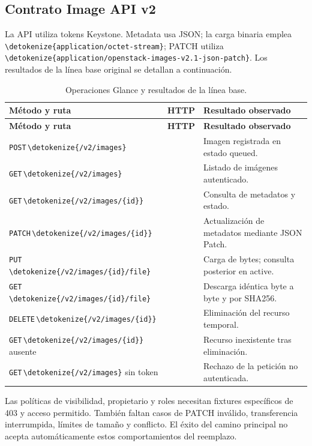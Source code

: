 \documentclass[12pt,a4paper]{article}
\newcommand{\code}[1]{{\small\expandafter\nolinkurl\expandafter{\detokenize{#1}}}}
\newcommand{\reporttable}[4]{\begingroup\small\setlength{\LTpre}{8pt}\setlength{\LTpost}{8pt}\setlength{\tabcolsep}{4pt}\renewcommand{\arraystretch}{1.15}
\begin{longtable}{#2}\caption{#1}\\\toprule #3\\\midrule\endfirsthead
\toprule #3\\\midrule\endhead\bottomrule\endfoot #4\end{longtable}\endgroup}
\begin{document}
\subsection{Contrato Image API v2}
La API utiliza tokens Keystone. Metadata usa JSON; la carga binaria emplea \code{application/octet-stream}; PATCH utiliza \code{application/openstack-images-v2.1-json-patch}. Los resultados de la línea base original se detallan a continuación.
\reporttable{Operaciones Glance y resultados de la línea base.}{>{\raggedright\arraybackslash}p{6.8cm}>{\raggedright\arraybackslash}p{1.5cm}>{\raggedright\arraybackslash}p{6.7cm}}{\textbf{Método y ruta}&\textbf{HTTP}&\textbf{Resultado observado}}{
\texttt{\small POST}\,\code{/v2/images}&201&Imagen registrada en estado queued.\\*
\texttt{\small GET}\,\code{/v2/images}&200&Listado de imágenes autenticado.\\*
\texttt{\small GET}\,\code{/v2/images/{id}}&200&Consulta de metadatos y estado.\\*
\texttt{\small PATCH}\,\code{/v2/images/{id}}&200&Actualización de metadatos mediante JSON Patch.\\*
\texttt{\small PUT}\,\code{/v2/images/{id}/file}&204&Carga de bytes; consulta posterior en active.\\*
\texttt{\small GET}\,\code{/v2/images/{id}/file}&200&Descarga idéntica byte a byte y por SHA256.\\*
\texttt{\small DELETE}\,\code{/v2/images/{id}}&204&Eliminación del recurso temporal.\\*
\texttt{\small GET}\,\code{/v2/images/{id}} ausente&404&Recurso inexistente tras eliminación.\\*
\texttt{\small GET}\,\code{/v2/images} sin token&401&Rechazo de la petición no autenticada.\\}
Las políticas de visibilidad, propietario y roles necesitan fixtures específicos de 403 y acceso permitido. También faltan casos de PATCH inválido, transferencia interrumpida, límites de tamaño y conflicto. El éxito del camino principal no acepta automáticamente estos comportamientos del reemplazo.
\end{document}
